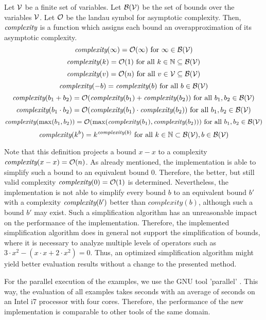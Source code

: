 \begin{definition}
  Let $\mathcal{V}$ be a finite set of variables.
  Let $\mathcal{B}(\mathcal{V})$ be the set of bounds over the variables $\mathcal{V}$.
  Let $\mathcal{O}$ be the landau symbol for asymptotic complexity.
  Then, $\emph{complexity}$ is a function which assigns each bound an overapproximation of its asymptotic complexity.
  \[ \emph{complexity}(\infty) = \mathcal{O}(\infty) \text{ for } \infty \in \mathcal{B}(\mathcal{V}) \]
  \[ \emph{complexity}(k) = \mathcal{O}(1) \text{ for all } k \in \mathbb{N} \subseteq \mathcal{B}(\mathcal{V}) \] 
  \[ \emph{complexity}(v) = \mathcal{O}(n) \text{ for all } v \in \mathcal{V} \subseteq \mathcal{B}(\mathcal{V}) \] 
  \[ \emph{complexity}(-b) = \emph{complexity}(b) \text{ for all } b \in \mathcal{B}(\mathcal{V}) \] 
  \[ \emph{complexity}(b_1 + b_2) = \mathcal{O}(\emph{complexity}(b_1) + \emph{complexity}(b_2)) \text{ for all } b_1, b_2 \in \mathcal{B}(\mathcal{V}) \] 
  \[ \emph{complexity}(b_1 \cdot b_2) = \mathcal{O}(\emph{complexity}(b_1) \cdot \emph{complexity}(b_2)) \text{ for all } b_1, b_2 \in \mathcal{B}(\mathcal{V}) \] 
  \[ \emph{complexity}(\max(b_1, b_2)) = \mathcal{O}(\max(\emph{complexity}(b_1), \emph{complexity}(b_2))) \text{ for all } b_1, b_2 \in \mathcal{B}(\mathcal{V}) \]
  \[ \emph{complexity}(k^b) = k^{\emph{complexity}(b)} \text{ for all } k \in \mathbb{N} \subset \mathcal{B}(\mathcal{V}), b \in \mathcal{B}(\mathcal{V}) \]  
\end{definition}

Note that this definition projects a bound $x-x$ to a complexity $\emph{complexity}(x-x) = \mathcal{O}(n)$.
As already mentioned, the implementation is able to simplify such a bound to an equivalent bound $0$.
Therefore, the better, but still valid complexity $\emph{complexity}(0) = \mathcal{O}(1)$ is determined.
Nevertheless, the implementation is not able to simplify every bound $b$ to an equivalent bound $b'$ with a complexity $\emph{complexity}(b')$ better than $complexity(b)$, although such a bound $b'$ may exist.
Such a simplification algorithm has an unreasonable impact on the performance of the implementation.
Therefore, the implemented simplification algorithm does in general not support the simplification of bounds, where it is necessary to analyze multiple levels of operators such as $3 \cdot x^2-(x \cdot x+2 \cdot x^2) = 0$.
Thus, an optimized simplification algorithm might yield better evaluation results without a change to the presented method.

For the parallel execution of the examples, we use the GNU tool 'parallel' \cite{gnuparallel}.
This way, the evaluation of all examples takes  seconds with an average of  seconds on an Intel i7 processor with four cores.
Therefore, the performance of the new implementation is comparable to other tools of the same domain.

